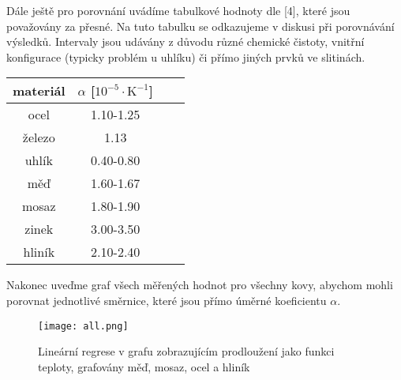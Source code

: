 \documentclass{article}
\begin{document}
Dále ještě pro porovnání uvádíme tabulkové hodnoty dle [4], které jsou považovány za přesné. Na tuto tabulku se odkazujeme v diskusi při porovnávání výsledků. Intervaly jsou udávány z důvodu různé chemické čistoty, vnitřní konfigurace (typicky problém u uhlíku) či přímo jiných prvků ve slitinách.
\begin{center}
    \label{tab:title}
    \begin{tabular}{ | c | c | c  | m{4cm} |} \hline
    materiál & $\alpha$ [$\mathrm{10^{-5} \cdot K^{-1}}$] \\ \hline
    ocel &  1.10-1.25 \\ \hline
    železo & 1.13 \\ \hline
    uhlík & 0.40-0.80 \\ \hline
    měď &  1.60-1.67 \\ \hline
    mosaz & 1.80-1.90 \\ \hline
    zinek & 3.00-3.50 \\ \hline
    hliník & 2.10-2.40 \\ \hline
    \end{tabular}
\end{center}
\par Nakonec uveďme graf všech měřených hodnot pro všechny kovy, abychom mohli porovnat jednotlivé směrnice, které jsou přímo úměrné koeficientu $\alpha$.
\begin{figure}[H]
\centering
\texttt{[image: all.png]}
\caption{Lineární regrese v grafu zobrazujícím prodloužení jako funkci teploty, grafovány měď, mosaz, ocel a hliník}
\end{figure}
\end{document}
